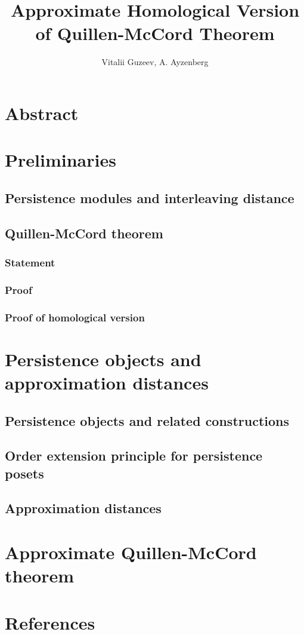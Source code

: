 \documentclass[a4paper, 12pt]{article}
\title{Approximate Homological Version of Quillen-McCord Theorem}
\author{Vitalii Guzeev, A. Ayzenberg}
\theoremstyle{definition}
\theoremstyle{remark}
\begin{document}
\section{Abstract}


\section{Preliminaries}

\subsection{Persistence modules and interleaving distance}


\subsection{Quillen-McCord theorem}

\subsubsection{Statement}


\subsubsection{Proof}


\subsubsection{Proof of homological version}


\section{Persistence objects and approximation distances}

\subsection{Persistence objects and related constructions}


\subsection{Order extension principle for persistence posets}


\subsection{Approximation distances}


\section{Approximate Quillen-McCord theorem}


\section{References}

\end{document}
